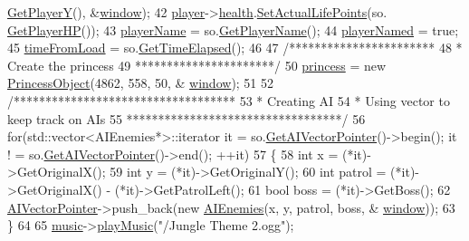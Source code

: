 \begin{DoxyCode}
      \hyperlink{classSavedObject_ab3361faa4e657843775255df73273c16}{GetPlayerY}(), &\hyperlink{classTestApp_a0b6b080a777092db64519ef7c4309105}{window});
42         \hyperlink{classTestApp_a72c21fba56a65699606328b9e765d6db}{player}->\hyperlink{classPlayerObject_ad09efd50cf54cefed3250636a2fb1013}{health}.\hyperlink{classHealth_abca68d47c02b173013543c46b794bca7}{SetActualLifePoints}(so.
      \hyperlink{classSavedObject_a848f34a0320688c945fc327af3e357cf}{GetPlayerHP}());
43         \hyperlink{classTestApp_a0e02b27103439e2947632007ad9fe122}{playerName} = so.\hyperlink{classSavedObject_a6490504886dafe201eaa2c81b47e697c}{GetPlayerName}();
44         \hyperlink{classTestApp_a99c2afa2a2f7e902d2f17d43658d16b3}{playerNamed} = \textcolor{keyword}{true};
45         \hyperlink{classTestApp_a24a4c1488f91c8e7933b8f6cc4230d01}{timeFromLoad} = so.\hyperlink{classSavedObject_a1ec2c3f0c70d429b4a71970b870f0c1d}{GetTimeElapsed}();
46 
47         \textcolor{comment}{/***********************}
48 \textcolor{comment}{         *  Create the princess}
49 \textcolor{comment}{         **********************/}
50         \hyperlink{classTestApp_a99d5d1cabf9afb7550bac5a504f72875}{princess} = \textcolor{keyword}{new} \hyperlink{classPrincessObject}{PrincessObject}(4862, 558, 50, &
      \hyperlink{classTestApp_a0b6b080a777092db64519ef7c4309105}{window});
51 
52         \textcolor{comment}{/***********************************}
53 \textcolor{comment}{         * Creating AI}
54 \textcolor{comment}{         * Using vector to keep track on AIs}
55 \textcolor{comment}{         **********************************/}
56         \textcolor{keywordflow}{for}(std::vector<AIEnemies*>::iterator it = so.\hyperlink{classSavedObject_a2b004f7724467e3ee35cd82354e4372b}{GetAIVectorPointer}()->begin(); it !
      = so.\hyperlink{classSavedObject_a2b004f7724467e3ee35cd82354e4372b}{GetAIVectorPointer}()->end(); ++it)
57         \{
58             \textcolor{keywordtype}{int} x = (*it)->GetOriginalX();
59             \textcolor{keywordtype}{int} y = (*it)->GetOriginalY();
60             \textcolor{keywordtype}{int} patrol = (*it)->GetOriginalX() - (*it)->GetPatrolLeft();
61             \textcolor{keywordtype}{bool} boss = (*it)->GetBoss();
62             \hyperlink{classTestApp_ac409d674f567c5d2ea773bd7ec3036d9}{AIVectorPointer}->push\_back(\textcolor{keyword}{new} \hyperlink{classAIEnemies}{AIEnemies}(x, y, patrol, boss, &
      \hyperlink{classTestApp_a0b6b080a777092db64519ef7c4309105}{window}));
63         \}
64 
65         \hyperlink{classTestApp_a0aab55007364bd9b7c45a914feafd166}{music}->\hyperlink{classMusic_aafbf12ec36f4401d544403521fb4b2c5}{playMusic}(\textcolor{stringliteral}{"/Jungle Theme 2.ogg"});

\end{DoxyCode}
